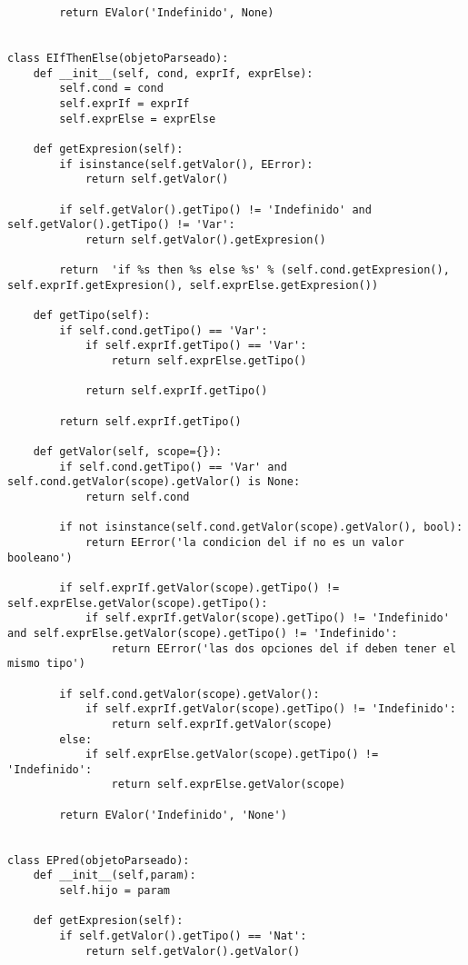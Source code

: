 \begin{verbatim}
        return EValor('Indefinido', None)


class EIfThenElse(objetoParseado):
    def __init__(self, cond, exprIf, exprElse):
        self.cond = cond
        self.exprIf = exprIf
        self.exprElse = exprElse
    
    def getExpresion(self):
        if isinstance(self.getValor(), EError):
            return self.getValor()

        if self.getValor().getTipo() != 'Indefinido' and self.getValor().getTipo() != 'Var':            
            return self.getValor().getExpresion()

        return  'if %s then %s else %s' % (self.cond.getExpresion(), self.exprIf.getExpresion(), self.exprElse.getExpresion())

    def getTipo(self):
        if self.cond.getTipo() == 'Var':
            if self.exprIf.getTipo() == 'Var':
                return self.exprElse.getTipo()

            return self.exprIf.getTipo()

        return self.exprIf.getTipo()

    def getValor(self, scope={}):
        if self.cond.getTipo() == 'Var' and self.cond.getValor(scope).getValor() is None:
            return self.cond

        if not isinstance(self.cond.getValor(scope).getValor(), bool):
            return EError('la condicion del if no es un valor booleano')

        if self.exprIf.getValor(scope).getTipo() != self.exprElse.getValor(scope).getTipo():
            if self.exprIf.getValor(scope).getTipo() != 'Indefinido' and self.exprElse.getValor(scope).getTipo() != 'Indefinido':
                return EError('las dos opciones del if deben tener el mismo tipo')

        if self.cond.getValor(scope).getValor():
            if self.exprIf.getValor(scope).getTipo() != 'Indefinido':
                return self.exprIf.getValor(scope)
        else:    
            if self.exprElse.getValor(scope).getTipo() != 'Indefinido':
                return self.exprElse.getValor(scope)
        
        return EValor('Indefinido', 'None')


class EPred(objetoParseado):
    def __init__(self,param):
        self.hijo = param

    def getExpresion(self):
        if self.getValor().getTipo() == 'Nat':
            return self.getValor().getValor()
        

\end{verbatim}
